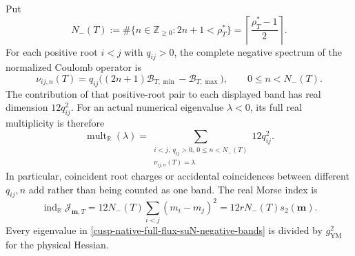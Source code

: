 \begin{theorem}
\label{cusp-native-full-flux-suN-Morse-theorem}
Put
\begin{equation}
 N_-(T):=\#\{n\in\mathbb Z_{\ge0}:2n+1<\rho_T^*\}
 =\left\lceil\frac{\rho_T^*-1}{2}\right\rceil.
 \label{cusp-native-full-flux-suN-N-minus}
\end{equation}
For each positive root \(i<j\) with \(q_{ij}>0\), the complete negative
spectrum of the normalized Coulomb operator is
\begin{equation}
 \nu_{ij,n}(T)
 =q_{ij}\bigl((2n+1)\mathcal B_{T,\min}
                  -\mathcal B_{T,\max}\bigr),
 \qquad 0\le n<N_-(T).
 \label{cusp-native-full-flux-suN-negative-bands}
\end{equation}
The contribution of that positive-root pair to each displayed band has real
dimension \(12q_{ij}^2\).  For an actual numerical eigenvalue
\(\lambda<0\), its full real multiplicity is therefore
\begin{equation}
 \operatorname{mult}_{\mathbb R}(\lambda)
 =\sum_{\substack{i<j,\ q_{ij}>0,\ 0\le n<N_-(T)\\
                   \nu_{ij,n}(T)=\lambda}}
   12q_{ij}^2.
 \label{cusp-native-full-flux-suN-coincident-multiplicity}
\end{equation}
In particular, coincident root charges or accidental coincidences between
different \(q_{ij},n\) add rather than being counted as one band.  The real
Morse index is
\begin{equation}
 \boxed{
 \operatorname{ind}_{\mathbb R}\mathcal J_{\mathbf m,T}
 =12N_-(T)\sum_{i<j}(m_i-m_j)^2
 =12rN_-(T)s_2(\mathbf m).}
 \label{cusp-native-full-flux-suN-index}
\end{equation}
Every eigenvalue in
\cref{cusp-native-full-flux-suN-negative-bands} is divided by
\(g_{\mathrm{YM}}^2\) for the physical Hessian.
\end{theorem}

